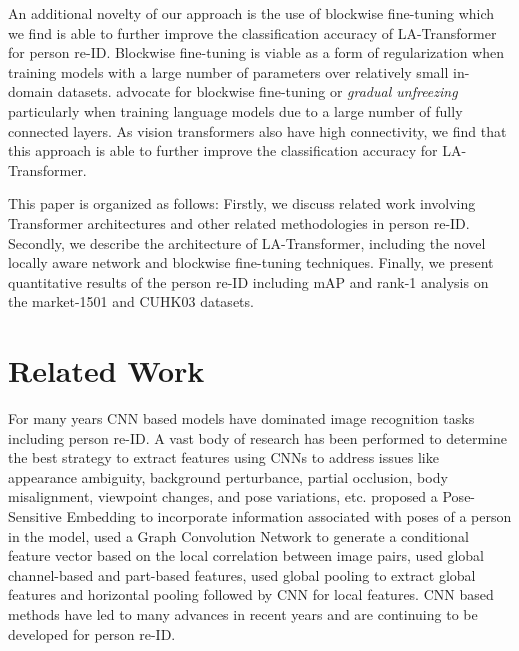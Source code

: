 \documentclass{article}
\begin{document}
An additional novelty of our approach is the use of blockwise fine-tuning which we find is able to further improve the classification accuracy of LA-Transformer for person re-ID.  Blockwise fine-tuning is viable as a form of regularization when training models with a large number of parameters over relatively small in-domain datasets. \citet{ULMFit} advocate for blockwise fine-tuning or \textit{gradual unfreezing} particularly when training language models due to a large number of fully connected layers. As vision transformers also have high connectivity, we find that this approach is able to further improve the classification accuracy for LA-Transformer.

This paper is organized as follows: Firstly, we discuss related work involving Transformer architectures and other related methodologies in person re-ID. Secondly, we describe the architecture of LA-Transformer, including the novel locally aware network and blockwise fine-tuning techniques. Finally, we present quantitative results of the person re-ID including mAP and rank-1 analysis on the market-1501 and CUHK03 datasets.

\section{Related Work}

For many years CNN based models have dominated image recognition tasks including person re-ID.  A vast body of research has been performed to determine the best strategy to extract features using CNNs to address issues like appearance ambiguity, background perturbance, partial occlusion, body misalignment, viewpoint changes, and pose variations, etc.  \citet{posesensitive} proposed a Pose-Sensitive Embedding to incorporate information associated with poses of a person in the model, \citet{conditionalEmbedding} used a Graph Convolution Network \citep{GCN} to generate a conditional feature vector based on the local correlation between image pairs, \citet{lightweight} used global channel-based and part-based features, \citet{alignedreid} used global pooling to extract global features and horizontal pooling followed by  CNN for local features.  CNN based methods have led to many advances in recent years and are continuing to be developed for person re-ID.
\end{document}
